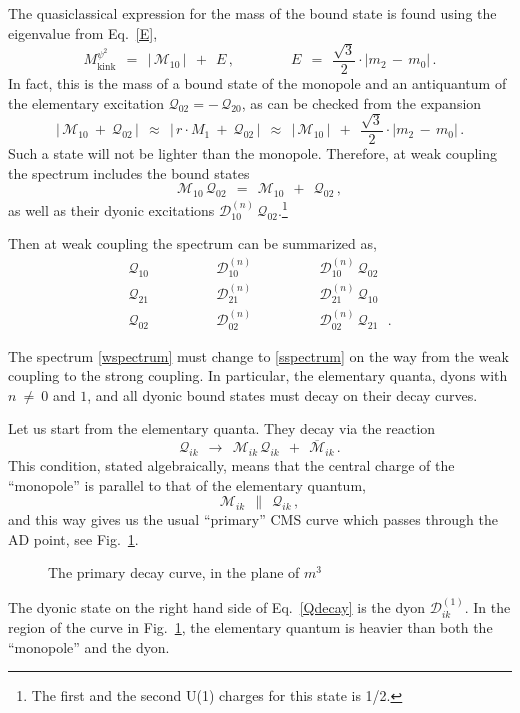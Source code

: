 \documentclass[epsfig,12pt]{article}
\def\beq{\begin{equation}}
\def\eeq{\end{equation}}
\def\beq{\begin{equation}}
\def\eeq{\end{equation}}
\newcommand{\ov}{\overline}
\newcommand{\M}{\mathcal{M}}
\newcommand{\Q}{\mathcal{Q}}
\newcommand{\D}{\mathcal{D}}
\begin{document}
	The quasiclassical expression for the mass of the bound state is found using the eigenvalue from Eq.~\eqref{E},
\beq
\label{kinkpsi}
	M_\text{kink}^{\psi^2}  ~~=~~ \left|\, \M_{10} \,\right|  ~~+~~  E\,,  
	\qquad\qquad
	E  ~~=~~  \frac{\sqrt{3}}{2} \cdot | m_2 \,-\, m_0 |\,.
\eeq
	In fact, this is the mass of a bound state of the monopole and an antiquantum of the 
	elementary excitation
$ \Q_{02} =  -\, \Q_{20} $,
	as can be checked from the expansion
\beq
	\left|\, \M_{10} ~+~ \Q_{02} \,\right|  ~~\approx~~  \left|\, r \cdot M_1 ~+~ \Q_{02} \,\right|
					        ~~\approx~~  \left|\, \M_{10} \,\right|  ~~+~~  \frac{\sqrt{3}}{2} \cdot | m_2 \,-\, m_0 |\,.
\eeq
	Such a state will not be lighter than the monopole.
	Therefore, at weak coupling the spectrum includes the bound states
\beq
	\M_{10}\,\Q_{02}  ~~=~~  \M_{10}  ~~+~~  \Q_{02}\,,
\eeq
	as well as their dyonic excitations $ \D_{10}^{(n)}\,\Q_{02} $.\footnote{The first and the second  U(1) charges for this state is 1/2.}
	

	Then at weak coupling the spectrum can be summarized as,
\beq
\label{wspectrum}
	\begin{array}{ccc}
		\Q_{10} \qquad\qquad    &    \D_{10}^{(n)} \qquad\qquad    &    \D_{10}^{(n)}\, \Q_{02}   \phantom{~~~.}    \\[2mm]
		\Q_{21} \qquad\qquad    &    \D_{21}^{(n)} \qquad\qquad    &    \D_{21}^{(n)}\, \Q_{10}   \phantom{~~~.}    \\[2mm]
		\Q_{02} \qquad\qquad    &    \D_{02}^{(n)} \qquad\qquad    &    \D_{02}^{(n)}\, \Q_{21}   ~~~.
	\end{array}
\eeq

	The spectrum \eqref{wspectrum} must change to \eqref{sspectrum} on the way from the weak coupling to the strong coupling.
	In particular, the elementary quanta, dyons with $ n ~\neq~ 0 $ and $ 1 $, and all dyonic bound states  
	must decay on their decay curves.

	Let us start from the elementary quanta.
	They decay via the reaction
\beq
\label{Qdecay}
	\Q_{ik}  ~~\longrightarrow~~  \M_{ik}\, \Q_{ik} ~~+~~ \ov{\M}{}_{ik}\,.
\eeq
	This condition, stated algebraically, means that the central charge of the ``monopole'' 
	is parallel to that of the elementary quantum,
\beq
\label{parallel}
	\M_{ik}  ~~\parallel~~  \Q_{ik}\,,
\eeq
	and this way gives us the usual ``primary'' CMS curve which passes through the AD point, see Fig.~\ref{fprim}.
\begin{figure}
\begin{center}
\epsfxsize=7.5cm
\caption{\small The primary decay curve, in the plane of $ m^3 $}
\label{fprim}
\end{center}
\end{figure}
	The dyonic state on the right hand side of Eq.~\eqref{Qdecay} is the dyon $ \D_{ik}^{(1)} $.
	In the region of the curve in Fig.~\ref{fprim}, the elementary quantum is heavier than both the ``monopole'' and the 
	dyon.
	
\end{document}
